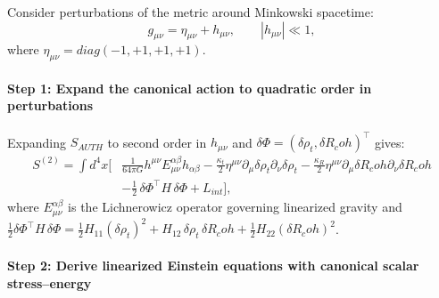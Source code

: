 \documentclass[american,11pt,letterpaper]{article}
\newcommand{\Rcoh}{R_{\mathrm{coh}}}
\def\mathcal#1{#1}%
\def\mathrm#1{#1}%
\def\Rcoh{R_coh}%
\begin{document}
Consider perturbations of the metric around Minkowski spacetime:
\[
g_{\mu\nu} = \eta_{\mu\nu} + h_{\mu\nu}, \qquad |h_{\mu\nu}| \ll 1,
\]
where $\eta_{\mu\nu} = \mathrm{diag}(-1, +1, +1, +1)$.

\paragraph{Step 1: Expand the canonical action to quadratic order in perturbations}

Expanding $S_{\mathrm{AUTH}}$ to second order in $h_{\mu\nu}$ and $\delta\Phi = (\delta\rho_t, \delta\Rcoh)^\top$ gives:
\begin{equation}
\label{eq:expanded_action}
\begin{split}
S^{(2)} = \int d^4x \Biggl[ &
    \frac{1}{64 \pi G} h^{\mu\nu} \mathcal{E}_{\mu\nu}^{\alpha\beta} h_{\alpha\beta}
    - \frac{\kappa_t}{2} \eta^{\mu\nu} \partial_\mu \delta \rho_t \partial_\nu \delta \rho_t
    - \frac{\kappa_R}{2} \eta^{\mu\nu} \partial_\mu \delta \Rcoh \partial_\nu \delta \Rcoh \\
&   - \frac{1}{2}\,\delta\Phi^\top H\,\delta\Phi
    + \mathcal{L}_{\mathrm{int}} \Biggr],
\end{split}
\end{equation}
where $\mathcal{E}_{\mu\nu}^{\alpha\beta}$ is the Lichnerowicz operator governing linearized gravity and $\frac{1}{2}\delta\Phi^\top H\,\delta\Phi = \frac{1}{2}H_{11}(\delta\rho_t)^2 + H_{12}\,\delta\rho_t\,\delta\Rcoh + \frac{1}{2}H_{22}(\delta\Rcoh)^2$.

\paragraph{Step 2: Derive linearized Einstein equations with canonical scalar stress--energy}
\end{document}
